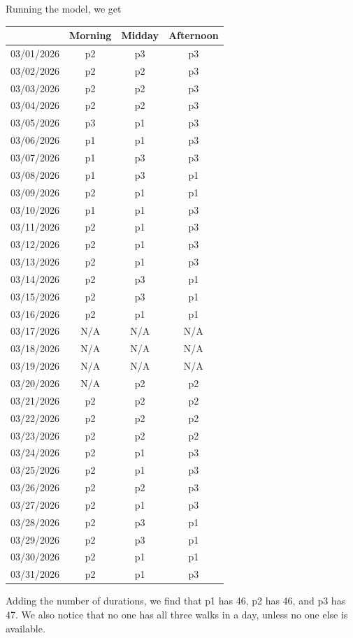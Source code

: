\documentclass{notes}
\begin{document}
Running the model, we get
\begin{center}
	\begin{tabular}{c|ccc}
		& Morning & Midday & Afternoon\\
		\hline
		03/01/2026 & p2 & p3 & p3\\
		03/02/2026 & p2 & p2 & p3\\
		03/03/2026 & p2 & p2 & p3\\
		03/04/2026 & p2 & p2 & p3\\
		03/05/2026 & p3 & p1 & p3\\
		03/06/2026 & p1 & p1 & p3\\
		03/07/2026 & p1 & p3 & p3\\
		03/08/2026 & p1 & p3 & p1\\
		03/09/2026 & p2 & p1 & p1\\
		03/10/2026 & p1 & p1 & p3\\
		03/11/2026 & p2 & p1 & p3\\
		03/12/2026 & p2 & p1 & p3\\
		03/13/2026 & p2 & p1 & p3\\
		03/14/2026 & p2 & p3 & p1\\
		03/15/2026 & p2 & p3 & p1\\
		03/16/2026 & p2 & p1 & p1\\
		03/17/2026 & N/A & N/A & N/A\\
		03/18/2026 & N/A & N/A & N/A\\
		03/19/2026 & N/A & N/A & N/A\\
		03/20/2026 & N/A & p2 & p2\\
		03/21/2026 & p2 & p2 & p2\\
		03/22/2026 & p2 & p2 & p2\\
		03/23/2026 & p2 & p2 & p2\\
		03/24/2026 & p2 & p1 & p3\\
		03/25/2026 & p2 & p1 & p3\\
		03/26/2026 & p2 & p2 & p3\\
		03/27/2026 & p2 & p1 & p3\\
		03/28/2026 & p2 & p3 & p1\\
		03/29/2026 & p2 & p3 & p1\\
		03/30/2026 & p2 & p1 & p1\\
		03/31/2026 & p2 & p1 & p3
	\end{tabular}
\end{center}
Adding the number of durations, we find that p1 has 46, p2 has 46, and p3 has 47. We also notice that no one has all three walks in a day, unless no one else is available.
\end{document}
